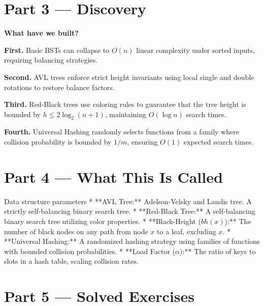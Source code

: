 \documentclass[12pt, a4paper]{book}
\begin{document}
\newpage

\section{Part 3 --- Discovery}

\begin{discoverybox}
\textbf{What have we built?}

\textbf{First.} Basic BSTs can collapse to $O(n)$ linear complexity under sorted inputs, requiring balancing strategies.

\textbf{Second.} AVL trees enforce strict height invariants using local single and double rotations to restore balance factors.

\textbf{Third.} Red-Black trees use coloring rules to guarantee that the tree height is bounded by $h \le 2 \log_2(n+1)$, maintaining $O(\log n)$ search times.

\textbf{Fourth.} Universal Hashing randomly selects functions from a family where collision probability is bounded by $1/m$, ensuring $O(1)$ expected search times.
\end{discoverybox}

\newpage

\section{Part 4 --- What This Is Called}

\begin{namedconcept}{Data structure parameters}
* **AVL Tree:** Adelson-Velsky and Landis tree. A strictly self-balancing binary search tree.
* **Red-Black Tree:** A self-balancing binary search tree utilizing color properties.
* **Black-Height ($bh(x)$):** The number of black nodes on any path from node $x$ to a leaf, excluding $x$.
* **Universal Hashing:** A randomized hashing strategy using families of functions with bounded collision probabilities.
* **Load Factor ($\alpha$):** The ratio of keys to slots in a hash table, scaling collision rates.
\end{namedconcept}

\newpage

\section{Part 5 --- Solved Exercises}
\end{document}
